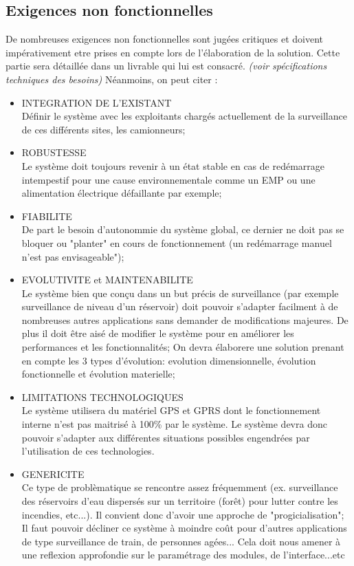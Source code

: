 \subsection{Exigences non fonctionnelles}
De nombreuses exigences non fonctionnelles sont jugées critiques et doivent impérativement etre prises en compte lors de l'élaboration de la solution.
Cette partie sera détaillée dans un livrable qui lui est consacré. \textit{(voir spécifications techniques des besoins)}
Néanmoins, on peut citer :
\begin{itemize}
\item {INTEGRATION DE L'EXISTANT} \\
Définir le système avec les exploitants chargés actuellement de la surveillance de ces différents sites, les camionneurs;
\item {ROBUSTESSE}\\
Le système doit toujours revenir à un état stable en cas de redémarrage intempestif pour une cause environnementale comme un EMP ou une
alimentation électrique défaillante par exemple;
\item {FIABILITE}\\De part le besoin d'autonommie du système global, ce dernier ne doit pas se bloquer ou "planter" en cours de fonctionnement
(un redémarrage manuel n'est pas envisageable");
\item {EVOLUTIVITE et MAINTENABILITE}\\
Le système bien que conçu dans un but précis de surveillance (par exemple surveillance de niveau d'un réservoir) doit pouvoir s'adapter facilment
à de nombreuses autres applications sans demander de modifications majeures. De plus il doit être aisé de modifier le système pour en améliorer
les performances et les fonctionnalités; On devra élaborere une solution prenant en compte les 3 types d'évolution: evolution dimensionnelle, évolution
fonctionnelle et évolution materielle;
\item {LIMITATIONS TECHNOLOGIQUES}\\
Le système utilisera du matériel GPS et GPRS dont le fonctionnement interne n'est pas maitrisé à 100\% par le système. Le système devra donc pouvoir
s'adapter aux différentes situations possibles engendrées par l'utilisation de ces technologies.
\item {GENERICITE}\\
Ce type de problèmatique se rencontre assez fréquemment (ex. surveillance des réservoirs d'eau dispersés sur un territoire (forêt) pour lutter
contre les incendies, etc...). Il convient donc d'avoir une approche de "progicialisation"; Il faut pouvoir décliner ce système à moindre coût pour d'autres
applications de type surveillance de train, de personnes agées... Cela doit nous amener à une reflexion approfondie sur le paramétrage des modules, de l'interface...etc


\end{itemize}
